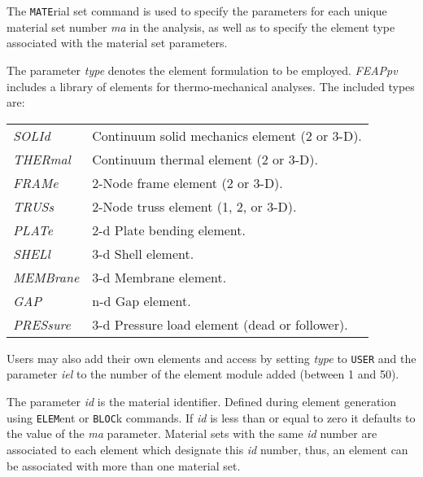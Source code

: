  \\{\smallskip}
 \\{\smallskip}
\headb

The {\tt MATE}rial set command is used to specify the parameters
for each unique material set number {\it ma} in the analysis, as well as to
specify the element type associated with the material set parameters.

The parameter {\it type} denotes the element formulation to be employed.
{\sl FEAPpv} includes a library of elements for thermo-mechanical analyses.
The included types are:

\begin{center}
\begin{tabular}{l l}
\it SOLId   & Continuum solid mechanics element (2 or 3-D). \\
\it THERmal & Continuum thermal element (2 or 3-D). \\
\it FRAMe   & 2-Node frame element (2 or 3-D). \\
\it TRUSs   & 2-Node truss element (1, 2, or 3-D). \\
\it PLATe   & 2-d Plate bending element. \\
\it SHELl   & 3-d Shell element. \\
\it MEMBrane & 3-d Membrane element. \\
\it GAP     & n-d Gap element. \\
\it PRESsure & 3-d Pressure load element (dead or follower). \\
\end{tabular}
\end{center}
Users
may also add their own elements and access by setting {\it type} to {\tt USER}
and the parameter {\it iel} to the number of the element module added (between
1 and 50).

The parameter {\it id} is the material identifier.  Defined during
element generation using {\tt ELEM}ent or {\tt BLOC}k commands.  If {\it id}
is less than or equal to zero it defaults to the value of the {\it ma}
parameter.  Material sets with the same {\it id} number are associated to each
element which designate this {\it id} number, thus, an element can be associated
with more than one material set.

